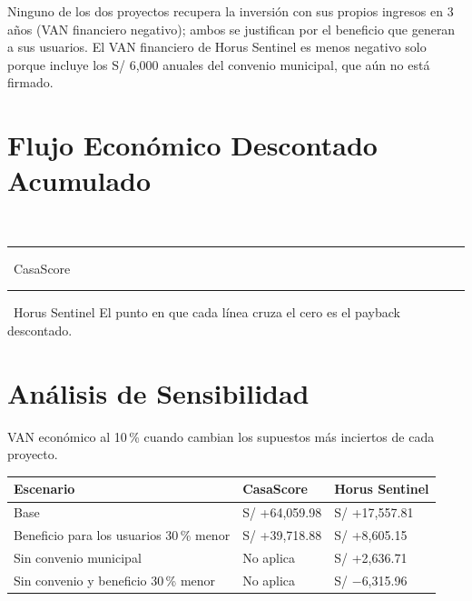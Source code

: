 \documentclass[11pt,a4paper]{article}
\begin{document}
\vspace{0.1cm}
\noindent Ninguno de los dos proyectos recupera la inversión con sus propios ingresos en 3 años (VAN financiero negativo); ambos se justifican por el beneficio que generan a sus usuarios. El VAN financiero de Horus Sentinel es menos negativo solo porque incluye los S/ 6,000 anuales del convenio municipal, que aún no está firmado.

\section{Flujo Económico Descontado Acumulado}
\begin{center}
\\[2pt]
{\scriptsize \textcolor{AzulUNA}{\rule{12pt}{2pt}}~CasaScore \quad \textcolor{DoradoFIEI}{\rule{12pt}{2pt}}~Horus Sentinel \quad El punto en que cada línea cruza el cero es el payback descontado.}
\end{center}

\section{Análisis de Sensibilidad}
VAN económico al 10\,\% cuando cambian los supuestos más inciertos de cada proyecto.

\vspace{0.1cm}
{\small
{}
\noindent\begin{tabularx}{\textwidth}{@{}L Q{3.2cm} Q{3.2cm}@{}}
\toprule
{}
\textbf{Escenario} & \textbf{CasaScore} & \textbf{Horus Sentinel} \\
\midrule
Base & S/ +64,059.98 & S/ +17,557.81 \\
Beneficio para los usuarios 30\,\% menor & S/ +39,718.88 & S/ +8,605.15 \\
Sin convenio municipal & No aplica & S/ +2,636.71 \\
Sin convenio y beneficio 30\,\% menor & No aplica & S/ $-$6,315.96 \\
\bottomrule
\end{tabularx}
}
\end{document}
